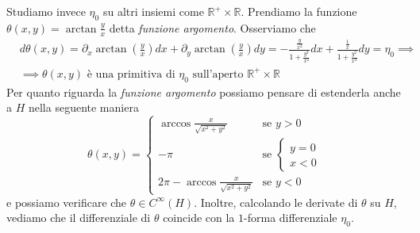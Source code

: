 \begin{remark}
$$$$ \noindent
Studiamo invece $\eta_0$ su altri insiemi come $\mathbb{R}^+ \times \mathbb{R}$. Prendiamo la funzione $\theta(x, y) = \arctan{\frac{y}{x}}$ detta \emph{funzione argomento}. Osserviamo che
\begin{align*}
&d\theta(x, y) = \partial_x \arctan{ \left( \frac{y}{x} \right) }dx + \partial_y \arctan{ \left( \frac{y}{x} \right) }dy = -\frac{\frac{y}{x^2}}{1 + \frac{y^2}{x^2}}dx + \frac{\frac{1}{x}}{1 + \frac{y^2}{x^2}}dy = \eta_0 \implies \\
&\implies \theta(x, y) \text{ è una primitiva di } \eta_0 \text{ sull'aperto } \mathbb{R}^+ \times \mathbb{R} 
\end{align*}
Per quanto riguarda la \emph{funzione argomento} possiamo pensare di estenderla anche a $H$ nella seguente maniera
\begin{equation*}
\theta(x, y) = \begin{cases}
	\arccos{\frac{x}{\sqrt{x^2 + y^2}}} & \text{se } y > 0 \\
	-\pi & \text{se } \begin{cases} y = 0 \\ x < 0 \end{cases} \\
	2 \pi - \arccos{\frac{x}{\sqrt{x^2+y^2}}} & \text{se } y < 0 
\end{cases}
\end{equation*}
e possiamo verificare che $\theta \in C^\infty(H)$. Inoltre, calcolando le derivate di $\theta$ su $H$, vediamo che il differenziale di $\theta$ coincide con la $1$-forma differenziale $\eta_0$.
\end{remark}